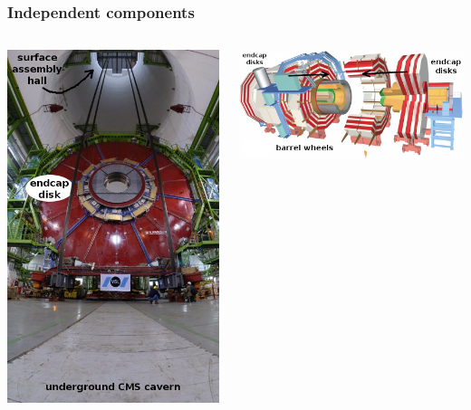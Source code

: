 \documentclass[compress]{beamer}
\begin{document}
\begin{frame}
\frametitle{Independent components}
\begin{columns}
\includegraphics[width=\linewidth]{lowering2.jpg}

\begin{center}
\includegraphics[width=0.8\linewidth]{modularity.png}
\end{center}


\end{columns}
\end{frame}
\end{document}
